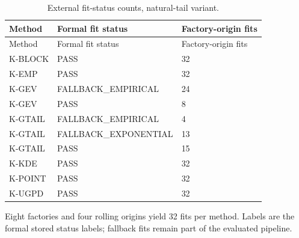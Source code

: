 \begingroup
\fontsize{8.5}{10.5}\selectfont\setlength{\tabcolsep}{3pt}
\begin{longtable}{@{}lll@{}}
\caption{External fit-status counts, natural-tail variant.}\label{tab:final-si-8}\\
\toprule
Method & Formal fit status & Factory-origin fits\\\midrule\endfirsthead
Method & Formal fit status & Factory-origin fits\\\midrule\endhead
K-BLOCK & PASS & 32\\
K-EMP & PASS & 32\\
K-GEV & FALLBACK\_EMPIRICAL & 24\\
K-GEV & PASS & 8\\
K-GTAIL & FALLBACK\_EMPIRICAL & 4\\
K-GTAIL & FALLBACK\_EXPONENTIAL & 13\\
K-GTAIL & PASS & 15\\
K-KDE & PASS & 32\\
K-POINT & PASS & 32\\
K-UGPD & PASS & 32\\
\bottomrule
\end{longtable}
\noindent\footnotesize Eight factories and four rolling origins yield 32 fits per method. Labels are the formal stored status labels; fallback fits remain part of the evaluated pipeline.
\endgroup
